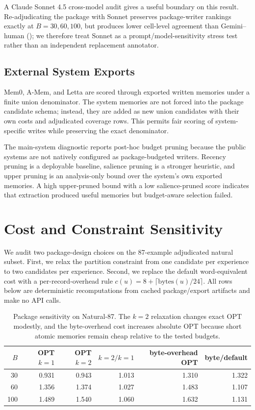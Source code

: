 \documentclass{article}
\theoremstyle{remark}
\theoremstyle{plain}
\begin{document}
A Claude Sonnet 4.5 cross-model audit gives a useful boundary on this result. Re-adjudicating the package with Sonnet preserves package-writer rankings exactly at $B=30,60,100$, but produces lower cell-level agreement than Gemini--human (); we therefore treat Sonnet as a prompt/model-sensitivity stress test rather than an independent replacement annotator.

\subsection{External System Exports}

Mem0, A-Mem, and Letta are scored through exported written memories under a finite union denominator. The system memories are not forced into the package candidate schema; instead, they are added as new union candidates with their own costs and adjudicated coverage rows. This permits fair scoring of system-specific writes while preserving the exact denominator.

The main-system diagnostic reports post-hoc budget pruning because the public systems are not natively configured as package-budgeted writers. Recency pruning is a deployable baseline, salience pruning is a stronger heuristic, and upper pruning is an analysis-only bound over the system's own exported memories. A high upper-pruned bound with a low salience-pruned score indicates that extraction produced useful memories but budget-aware selection failed.

\section{Cost and Constraint Sensitivity}\label{app:sensitivity}

We audit two package-design choices on the 87-example adjudicated natural subset. First, we relax the partition constraint from one candidate per experience to two candidates per experience. Second, we replace the default word-equivalent cost with a per-record-overhead rule $c(u)=8+\lceil\mathrm{bytes}(u)/24\rceil$. All rows below are deterministic recomputations from cached package/export artifacts and make no API calls.

\begin{table}[h]
\centering
\caption{Package sensitivity on Natural-87. The $k=2$ relaxation changes exact OPT modestly, and the byte-overhead cost increases absolute OPT because short atomic memories remain cheap relative to the tested budgets.}
\label{tab:sensitivity-package}
\begin{tabular}{rrrrrr}
\toprule
$B$ & OPT $k=1$ & OPT $k=2$ & $k=2/k=1$ & byte-overhead OPT & byte/default \\
\midrule
30 & 0.931 & 0.943 & 1.013 & 1.310 & 1.322 \\
60 & 1.356 & 1.374 & 1.027 & 1.483 & 1.107 \\
100 & 1.489 & 1.540 & 1.060 & 1.632 & 1.131 \\
\bottomrule
\end{tabular}
\end{table}
\end{document}
